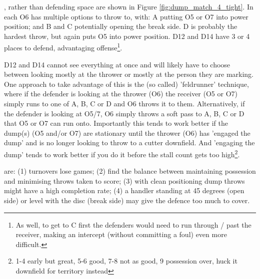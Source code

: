 \documentclass{tufte-handout}
\begin{document}
, 
rather than defending space are shown in Figure \ref{fig:dump_match_4_tight}. 
In each O6 has multiple options to
throw to, with: A putting O5 or O7 into power position;
and B and C potentially opening the break side. 
D is probably the hardest throw, but again puts O5 into 
power position. 
D12 and D14 have 3 or 4 places to defend, advantaging offense\footnote{
As well, to get to C first the defenders would need to 
run through / past the receiver, making an intercept 
(without committing a foul) even more difficult.}.  

D12 and D14 cannot see everything at once 
and will likely have to choose between looking mostly 
at the thrower or mostly at the person they are marking. 
One approach to take advantage of this is the (so called) 'feldrunner' 
technique, where if the defender is looking at the thrower (O6) 
the receiver (O5 or O7) simply runs to one of A, B, C or D 
and O6 throws it to them.  
Alternatively, if the defender is looking at O5/7, 
O6 simply throws a soft pass to A, B, C or D that 
O5 or O7 can run onto.  
Importantly this 
tends to work better if the dump(s)
(O5 and/or O7) are stationary until 
the thrower (O6) has 'engaged the dump' 
and is no longer looking to throw to a cutter downfield. 
And 'engaging the dump' tends to work better 
if you do it before the stall count gets too high\footnote{1-4 early but great, 
5-6 good, 
7-8 not as good, 
9 possession over,
 huck it downfield for territory instead}. 

 are: (1) turnovers lose games; 
(2) find the balance between 
maintaining possession and minimising throws taken to score; 
(3) with clean positioning dump throws might have a high completion rate; 
(4) a handler standing at 45 degrees (open side) or level with the disc (break side) 
may give the defence too much to cover. 



\end{document}
